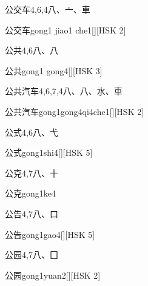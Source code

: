 \begin{entry}{公交车}{4,6,4}{⼋、⼇、⾞}
  \begin{phonetics}{公交车}{gong1 jiao1 che1}[][HSK 2]
  \end{phonetics}
\end{entry}

\begin{entry}{公共}{4,6}{⼋、⼋}
  \begin{phonetics}{公共}{gong1 gong4}[][HSK 3]
  \end{phonetics}
\end{entry}

\begin{entry}{公共汽车}{4,6,7,4}{⼋、⼋、⽔、⾞}
  \begin{phonetics}{公共汽车}{gong1gong4qi4che1}[][HSK 2]
  \end{phonetics}
\end{entry}

\begin{entry}{公式}{4,6}{⼋、⼷}
  \begin{phonetics}{公式}{gong1shi4}[][HSK 5]
  \end{phonetics}
\end{entry}

\begin{entry}{公克}{4,7}{⼋、⼗}
  \begin{phonetics}{公克}{gong1ke4}
  \end{phonetics}
\end{entry}

\begin{entry}{公告}{4,7}{⼋、⼝}
  \begin{phonetics}{公告}{gong1gao4}[][HSK 5]
  \end{phonetics}
\end{entry}

\begin{entry}{公园}{4,7}{⼋、⼞}
  \begin{phonetics}{公园}{gong1yuan2}[][HSK 2]
  \end{phonetics}
\end{entry}

